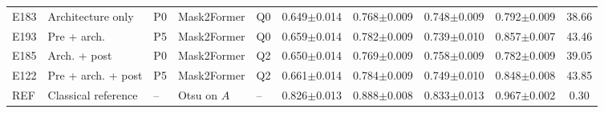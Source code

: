 \begin{table}[t]
{\begin{tabular}{@{}lllllccccc@{}}
\midrule
E183 & Architecture only & P0 & Mask2Former & Q0 & 0.649{\scriptsize$\pm$0.014} & 0.768{\scriptsize$\pm$0.009} & 0.748{\scriptsize$\pm$0.009} & 0.792{\scriptsize$\pm$0.009} & 38.66 \\
E193 & Pre + arch. & P5 & Mask2Former & Q0 & 0.659{\scriptsize$\pm$0.014} & 0.782{\scriptsize$\pm$0.009} & 0.739{\scriptsize$\pm$0.010} & 0.857{\scriptsize$\pm$0.007} & 43.46 \\
E185 & Arch. + post & P0 & Mask2Former & Q2 & 0.650{\scriptsize$\pm$0.014} & 0.769{\scriptsize$\pm$0.009} & 0.758{\scriptsize$\pm$0.009} & 0.782{\scriptsize$\pm$0.009} & 39.05 \\
E122 & Pre + arch. + post & P5 & Mask2Former & Q2 & 0.661{\scriptsize$\pm$0.014} & 0.784{\scriptsize$\pm$0.009} & 0.749{\scriptsize$\pm$0.010} & 0.848{\scriptsize$\pm$0.008} & 43.85 \\
\midrule
REF & Classical reference & -- & Otsu on $A$ & -- & 0.826{\scriptsize$\pm$0.013} & 0.888{\scriptsize$\pm$0.008} & 0.833{\scriptsize$\pm$0.013} & 0.967{\scriptsize$\pm$0.002} & 0.30 \\
\bottomrule
\end{tabular}}
\end{table}
